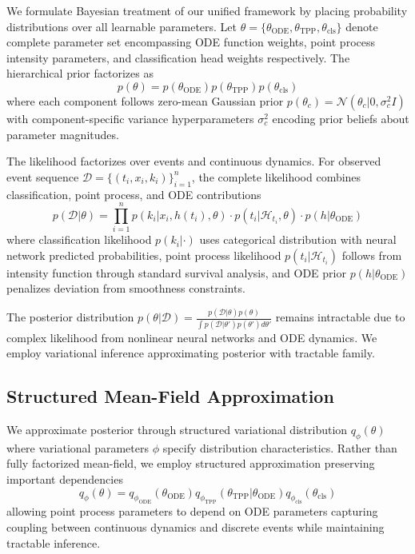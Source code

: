 \documentclass[10pt,journal,compsoc]{IEEEtran}
\begin{document}
We formulate Bayesian treatment of our unified framework by placing probability distributions over all learnable parameters. Let $\theta = \{\theta_{\text{ODE}}, \theta_{\text{TPP}}, \theta_{\text{cls}}\}$ denote complete parameter set encompassing ODE function weights, point process intensity parameters, and classification head weights respectively. The hierarchical prior factorizes as
\begin{equation}
p(\theta) = p(\theta_{\text{ODE}}) p(\theta_{\text{TPP}}) p(\theta_{\text{cls}})
\end{equation}
where each component follows zero-mean Gaussian prior $p(\theta_c) = \mathcal{N}(\theta_c | 0, \sigma_c^2 I)$ with component-specific variance hyperparameters $\sigma_c^2$ encoding prior beliefs about parameter magnitudes.

The likelihood factorizes over events and continuous dynamics. For observed event sequence $\mathcal{D} = \{(t_i, x_i, k_i)\}_{i=1}^n$, the complete likelihood combines classification, point process, and ODE contributions
\begin{equation}
p(\mathcal{D} | \theta) = \prod_{i=1}^n p(k_i | x_i, h(t_i), \theta) \cdot p(t_i | \mathcal{H}_{t_i}, \theta) \cdot p(h | \theta_{\text{ODE}})
\end{equation}
where classification likelihood $p(k_i | \cdot)$ uses categorical distribution with neural network predicted probabilities, point process likelihood $p(t_i | \mathcal{H}_{t_i})$ follows from intensity function through standard survival analysis, and ODE prior $p(h | \theta_{\text{ODE}})$ penalizes deviation from smoothness constraints.

The posterior distribution $p(\theta | \mathcal{D}) = \frac{p(\mathcal{D} | \theta)p(\theta)}{\int p(\mathcal{D} | \theta')p(\theta') d\theta'}$ remains intractable due to complex likelihood from nonlinear neural networks and ODE dynamics. We employ variational inference approximating posterior with tractable family.

\subsection{Structured Mean-Field Approximation}

We approximate posterior through structured variational distribution $q_\phi(\theta)$ where variational parameters $\phi$ specify distribution characteristics. Rather than fully factorized mean-field, we employ structured approximation preserving important dependencies
\begin{equation}
q_\phi(\theta) = q_{\phi_{\text{ODE}}}(\theta_{\text{ODE}}) q_{\phi_{\text{TPP}}}(\theta_{\text{TPP}} | \theta_{\text{ODE}}) q_{\phi_{\text{cls}}}(\theta_{\text{cls}})
\end{equation}
allowing point process parameters to depend on ODE parameters capturing coupling between continuous dynamics and discrete events while maintaining tractable inference.
\end{document}
